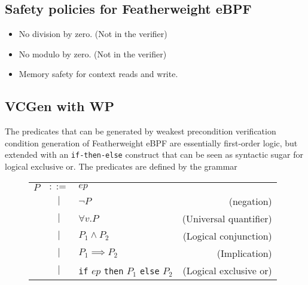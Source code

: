 \subsection{Safety policies for Featherweight eBPF}
\label{subsec:safety_policies_for_featherweight_ebpf}


\begin{itemize}
\item No division by zero. (Not in the verifier)
\item No modulo by zero. (Not in the verifier)  
\item Memory safety for context reads and write.

\end{itemize}


\subsection{VCGen with WP}
\label{subsec:vcgen_wp}

The predicates that can be generated by weakest precondition verification condition generation of Featherweight eBPF are essentially first-order logic, but extended with an \texttt{if-then-else} construct that can be seen as syntactic sugar for logical exclusive or. The predicates are defined by the grammar
\begin{figure}[H]
  \centering
  \begin{tabular}{lclr}
    $P$ & $::=$ & $ep$ & \\
                 & $|$ & $\neg P$ & (negation) \\    
                 & $|$ & $\forall v . P$ & (Universal quantifier) \\
                 & $|$ &  $P_1 \land P_2$ & (Logical conjunction) \\
                 & $|$ &  $P_1 \implies P_2$ & (Implication) \\
                 & $|$ &  \texttt{if} $ep$ \texttt{then} $P_1$ \texttt{else}  $P_2$ & (Logical exclusive or) \\        
\end{tabular}    
\end{figure}



